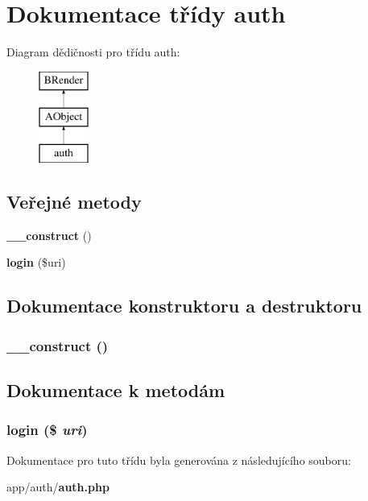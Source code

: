 \section{Dokumentace třídy auth}
\label{df/d38/classauth}
Diagram dědičnosti pro třídu auth:\begin{figure}[H]
\begin{center}
\leavevmode
\includegraphics[height=3cm]{df/d38/classauth}
\end{center}
\end{figure}
\subsection*{Veřejné metody}
\begin{DoxyCompactItemize}
\item 
{\bf \_\-\_\-construct} ()
\item 
{\bf login} (\$uri)
\end{DoxyCompactItemize}


\subsection{Dokumentace konstruktoru a destruktoru}
\subsubsection[{\_\-\_\-construct}]{\setlength{\rightskip}{0pt plus 5cm}\_\-\_\-construct ()}\label{df/d38/classauth_a095c5d389db211932136b53f25f39685}


\subsection{Dokumentace k metodám}
\subsubsection[{login}]{\setlength{\rightskip}{0pt plus 5cm}login (\$ {\em uri})}\label{df/d38/classauth_a97f8ba364b11d423b613066e13a53a50}


Dokumentace pro tuto třídu byla generována z následujícího souboru:\begin{DoxyCompactItemize}
\item 
app/auth/{\bf auth.php}\end{DoxyCompactItemize}
